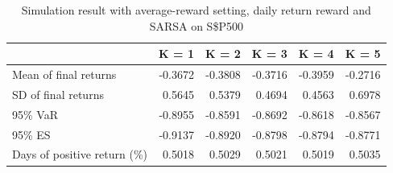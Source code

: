 \documentclass{article}
\begin{document}
\begin{table}[H]
\centering
\begin{tabular}{|l|r|r|r|r|r|} 
\hline
                             & \multicolumn{1}{l|}{K = 1} & \multicolumn{1}{l|}{K = 2} & \multicolumn{1}{l|}{K = 3} & \multicolumn{1}{l|}{K = 4} & \multicolumn{1}{l|}{K = 5}  \\ 
\hline
Mean of final returns        & -0.3672                    & -0.3808                    & -0.3716                    & -0.3959                    & -0.2716                     \\ 
\hline
SD of final returns          & 0.5645                     & 0.5379                     & 0.4694                     & 0.4563                     & 0.6978                      \\ 
\hline
95\% VaR                     & -0.8955                    & -0.8591                    & -0.8692                    & -0.8618                    & -0.8567                     \\ 
\hline
95\% ES                      & -0.9137                    & -0.8920                    & -0.8798                    & -0.8794                    & -0.8771                     \\ 
\hline
Days of positive return (\%) & 0.5018                     & 0.5029                     & 0.5021                     & 0.5019                     & 0.5035                      \\
\hline
\end{tabular}
\caption{Simulation result with average-reward setting, daily return reward and SARSA on S\$P500}
\label{table19}
\end{table}
\end{document}
